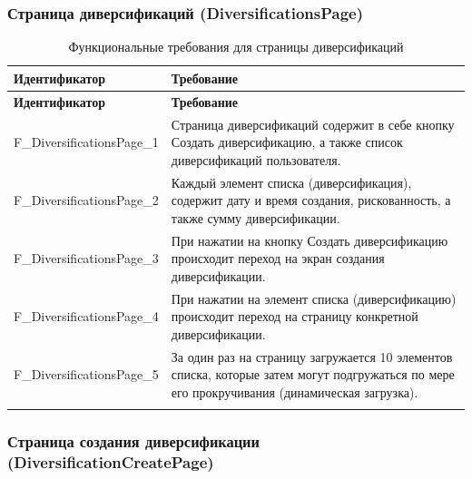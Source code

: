 \documentclass[a4paper, 14pt]{article}
\begin{document}
\subsubsection{Страница диверсификаций (DiversificationsPage)}

\begin{longtable}{| p{} | p{} |}
    \hline
    \textbf{Идентификатор}          & \textbf{Требование}                                                                                                                                                                \\
    \hline
    \endfirsthead
    \hline
    \textbf{Идентификатор}          & \textbf{Требование}                                                                                                                                                                \\
    \hline
    \endhead

    F\_DiversificationsPage\_1      & Страница диверсификаций содержит в себе кнопку Создать диверсификацию, а также список диверсификаций пользователя.                                                                 \\ \hline
    F\_DiversificationsPage\_2      & Каждый элемент списка (диверсификация), содержит дату и время создания, рискованность, а также сумму диверсификации.                                                               \\ \hline
    F\_DiversificationsPage\_3      & При нажатии на кнопку Создать диверсификацию происходит переход на экран создания диверсификации.                                                                                  \\ \hline
    F\_DiversificationsPage\_4      & При нажатии на элемент списка (диверсификацию) происходит переход на страницу конкретной диверсификации.                                                                           \\ \hline
    F\_DiversificationsPage\_5                & За один раз на страницу загружается 10 элементов списка, которые затем могут подгружаться по мере его прокручивания (динамическая загрузка).                             \\ \hline

    \caption{Функциональные требования для страницы диверсификаций}
\end{longtable}

\subsubsection{Страница создания диверсификации (DiversificationCreatePage)}
\end{document}
